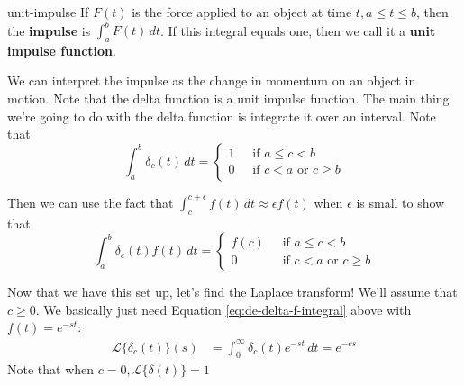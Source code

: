 \documentclass[letterpaper, 11pt, openany]{book}
\theoremstyle{mytheoremstyle}
\theoremstyle{myexamplestyle}
\begin{document}
\begin{definition}{}{unit-impulse}
    If \(F(t)\) is the force applied to an object at time \(t, a \leq t \leq b\), then the \textbf{impulse} is \(\displaystyle \int_a^b F(t) \, dt\). If this integral equals one, then we call it a \textbf{unit impulse function}.
\end{definition}

We can interpret the impulse as the change in momentum on an object in motion. Note that the delta function is a unit impulse function. The main thing we're going to do with the delta function is integrate it over an interval. Note that
\[ \int_{a}^{b} \delta_{c}(t) \, dt = \begin{cases}
   1 \; &\text{ if } a \leq c < b\\
   0  \; &\text{ if } c < a \text{ or } c \geq b
\end{cases}\]

Then we can use the fact that \(\displaystyle \int_{c}^{c + \epsilon} f(t)\, dt \approx \epsilon f(t)\) when \(\epsilon\) is small to show that
\begin{equation}\label{eq:de-delta-f-integral}
    \int_{a}^{b} \delta_{c}(t)f(t) \, dt = \begin{cases}
    f(c)  \; &\text{ if } a \leq c < b\\
    0  \; &\text{ if } c < a \text{ or } c \geq b
\end{cases}
\end{equation}

Now that we have this set up, let's find the Laplace transform! We'll assume that \(c \geq 0\). We basically just need Equation \ref{eq:de-delta-f-integral} above with \(f(t) = e^{-st}\):
\begin{align}\label{eq:de-Laplace-delta}
    \mathcal{L}\{\delta_{c}(t)\}(s) &= \int_{0}^{\infty} \delta_{c}(t) e^{-st} \, dt = e^{-cs}
\end{align}
Note that when \(c = 0, \mathcal{L}\{\delta(t)\} = 1\)\ \faSmile
\end{document}
